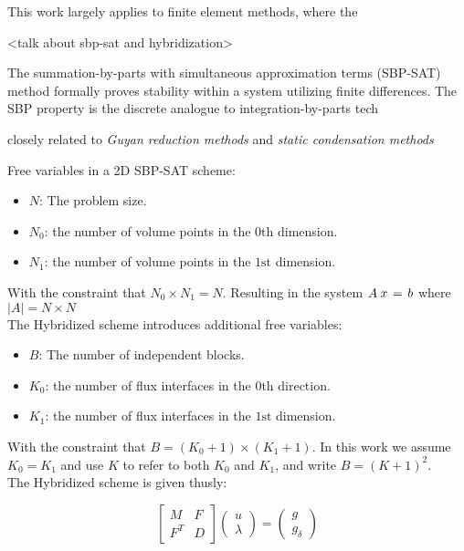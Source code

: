 

This work largely applies to finite element methods, where the


<talk about sbp-sat and hybridization> 

The summation-by-parts with simultaneous approximation terms (SBP-SAT) method formally proves stability within a system utilizing finite differences. The SBP property is the discrete analogue to integration-by-parts tech



closely related to \emph{Guyan reduction methods} and \emph{static condensation methods} \citep{guyan1965reduction, wilson1974static}

Free variables in a 2D SBP-SAT scheme:
\begin{itemize} 
    \item{$N$: The problem size.}
    \item{$N_{0}$: the number of volume points in the $0\text{th}$ 
        dimension.}
    \item{$N_{1}$: the number of volume points in the $1\text{st}$ 
        dimension.}
\end{itemize}
With the constraint that 
$N_{0} \times N_{1} = N$. Resulting in the system
$A \kern 0.25em x \kern 0.125 em = \kern 0.125 em b$ 
where 
$\vert A \vert = N \times N$ \\
\noindent
The Hybridized scheme introduces additional free variables: 
\begin{itemize} 
    \item{$B$: The number of independent blocks.}
    \item{$K_{0}$: the number of flux interfaces in the $0\text{th}$ 
        direction.}
    \item{$K_{1}$: the number of flux interfaces in the $1\text{st}$ 
        dimension.}
\end{itemize}

With the constraint that $B = (K_{0} + 1) \times (K_{1} + 1)$. In this 
work we assume $K_{0} = K_{1}$ and use $K$ to refer to both $K_{0}$ and $K_{1}$, and write $B = (K + 1)^2$. \\ 

\noindent
The Hybridized scheme is given thusly: 

\begin{equation}
    \left[\begin{array}{cc}
        M & F \\
        F^T & D
    \end{array}\right] 
    \left(\begin{array}{c}
        u \\
        \lambda
    \end{array}\right) = 
    \left(\begin{array}{c}
        g \\
        g_\delta
    \end{array}\right)
\end{equation}


